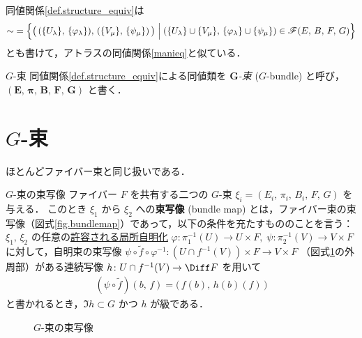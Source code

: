 \documentclass[geometry_main]{subfiles}
\begin{document}
同値関係\ref{def.structure_equiv}は
\begin{align}
	\sim \; = \Bigl\{ \bigl(\, (\{U_\lambda\},\, \{\varphi_\lambda\}),\, (\{V_\mu\},\, \{\psi_\mu\})\, \bigr)  \Bigm| (\{U_\lambda\} \cup \{V_\mu\},\, \{\varphi_\lambda\} \cup \{\psi_\mu\}) \in \mathscr{F}(E,\, B,\, F,\, G)  \Bigr\} 
\end{align}
とも書けて，アトラスの同値関係\ref{manieq}と似ている．

\begin{mydef}[label=def.G-bundle]{$G$-束}
	同値関係\ref{def.structure_equiv}による同値類を $\bm{G}$\emph{-束} ($G$-bundle) と呼び，$\bm{(E,\, \pi,\, B,\, F,\, G)}$ と書く．
\end{mydef}

\section{$G$-束}

ほとんどファイバー束と同じ扱いである．
\begin{mydef}[label=def.G-bundlemap]{$G$-束の束写像}
	ファイバー $F$ を共有する二つの $G$-束 $\xi_i = (E_i,\, \pi_i,\, B_i,\, F,\, G)$ を与える．
	このとき $\xi_1$ から $\xi_2$ への\textbf{束写像} (bundle map) とは，ファイバー束の束写像（図式\ref{fig.bundlemap}）であって，以下の条件を充たすもののことを言う：
	\tcblower
	$\xi_1,\, \xi_2$ の任意の\hyperref[def.addmissible]{許容される\hyperref[def.fiber-1]{局所自明化}} $\varphi \colon \pi_1^{-1}(U) \to U \times F,\; \psi \colon \pi_2^{-1}(V) \to V \times F $ に対して，自明束の束写像 $\psi \circ \tilde{f} \circ \varphi^{-1} \colon (U \cap f^{-1}(V)) \times F \to V \times F$ （図式\ref{fig.G-bundlemap}の外周部）がある連続写像 $h \colon U \cap f^{-1}(V) \to \Diff F$ を用いて
	\begin{align}
		(\psi \circ \tilde{f})(b,\, f) = \bigl( \, f(b),\, h(b)(f)\, \bigr) 
	\end{align}
	と書かれるとき，$\Im h \subset G$ かつ $h$ が\cinfty 級である．
\end{mydef}

\begin{figure}[H]
	\centering
	\caption{$G$-束の束写像}
	\label{fig.G-bundlemap}
\end{figure}%
\end{document}
